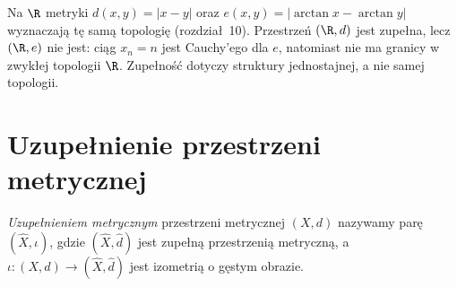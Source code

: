 \begin{przyklad}
\label{ex:topog-uzupelnienia-arctan}
Na $\R$ metryki $d(x,y)=|x-y|$ oraz
$e(x,y)=|\arctan x-\arctan y|$ wyznaczają tę
samą topologię (rozdział~10).
Przestrzeń $(\R,d)$ jest zupełna, lecz
$(\R,e)$ nie jest: ciąg $x_n=n$ jest
Cauchy'ego dla $e$, natomiast nie ma granicy
w zwykłej topologii $\R$.
Zupełność dotyczy struktury jednostajnej,
a nie samej topologii.
\end{przyklad}

\section{Uzupełnienie przestrzeni metrycznej}
\label{sec:topog-uzupelnienia-metryczne}

\begin{definicja}
\label{def:topog-uzupelnienia-metryczne}
\emph{Uzupełnieniem metrycznym} przestrzeni
metrycznej $(X,d)$ nazywamy parę
$(\widehat X,\iota)$, gdzie
$(\widehat X,\widehat d)$ jest zupełną przestrzenią
metryczną, a $\iota:(X,d)\to(\widehat X,\widehat d)$
jest izometrią o gęstym obrazie.
\end{definicja}


